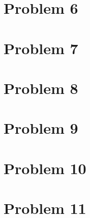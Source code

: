 \documentclass[12pt]{article}
\begin{document}
\section*{Problem 6}

\section*{Problem 7}

\section*{Problem 8}

\section*{Problem 9}

\section*{Problem 10}

\section*{Problem 11}
\end{document}
